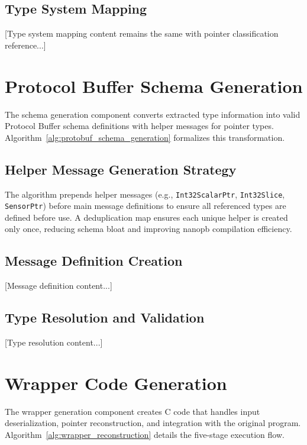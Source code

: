 \documentclass[doublespace,nopageskip]{VTthesis}
\begin{document}
  \subsection{Type System Mapping}

  [Type system mapping content remains the same with pointer classification reference...]

  \section{Protocol Buffer Schema Generation} \label{se:schema_generation}

  The schema generation component converts extracted type information into valid Protocol Buffer schema definitions with helper messages for pointer types. Algorithm~\ref{alg:protobuf_schema_generation} formalizes this transformation.

  

  \subsection{Helper Message Generation Strategy}

  The algorithm prepends helper messages (e.g., \texttt{Int32ScalarPtr}, \texttt{Int32Slice}, \texttt{SensorPtr}) before main message definitions to ensure all referenced types are defined before use. A deduplication map ensures each unique helper is created only once, reducing schema bloat and improving nanopb compilation efficiency.

  \subsection{Message Definition Creation}

  [Message definition content...]

  \subsection{Type Resolution and Validation}

  [Type resolution content...]

  \section{Wrapper Code Generation} \label{se:wrapper_generation}

  The wrapper generation component creates C code that handles input deserialization, pointer reconstruction, and integration with the original program. Algorithm~\ref{alg:wrapper_reconstruction} details the five-stage execution flow.
\end{document}
